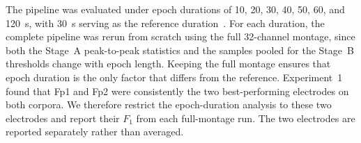 The pipeline was evaluated under epoch durations of 10, 20, 30, 40, 50, 60, and 120~s, with 30~s serving as the reference duration~\citep{ahn2016exploring,chai2017improving,lan2024driving,dai2023detection,chen2022fatigue}.
For each duration, the complete pipeline was rerun from scratch using the full 32-channel montage, since both the Stage~A peak-to-peak statistics and the samples pooled for the Stage~B thresholds change with epoch length. Keeping the full montage ensures that epoch duration is the only factor that differs from the reference. Experiment~1 found that Fp1 and Fp2 were consistently the two best-performing electrodes on both corpora. We therefore restrict the epoch-duration analysis to these two electrodes and report their $F_1$ from each full-montage run. The two electrodes are reported separately rather than averaged.
